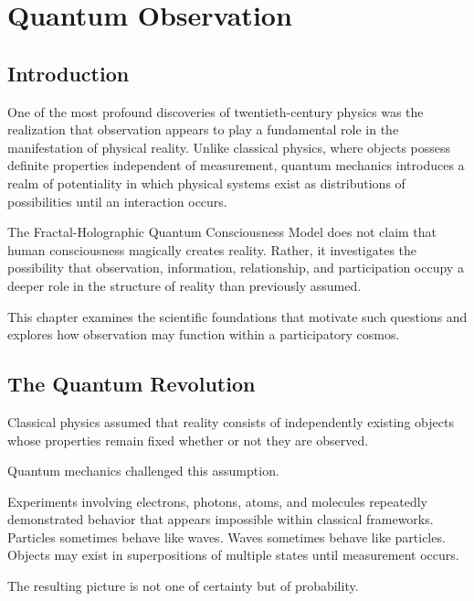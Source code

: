 \chapter{Quantum Observation}

\section{Introduction}

One of the most profound discoveries of twentieth-century physics was the realization that observation appears to play a fundamental role in the manifestation of physical reality. Unlike classical physics, where objects possess definite properties independent of measurement, quantum mechanics introduces a realm of potentiality in which physical systems exist as distributions of possibilities until an interaction occurs.

The Fractal-Holographic Quantum Consciousness Model does not claim that human consciousness magically creates reality. Rather, it investigates the possibility that observation, information, relationship, and participation occupy a deeper role in the structure of reality than previously assumed.

This chapter examines the scientific foundations that motivate such questions and explores how observation may function within a participatory cosmos.


\section{The Quantum Revolution}

Classical physics assumed that reality consists of independently existing objects whose properties remain fixed whether or not they are observed.

Quantum mechanics challenged this assumption.

Experiments involving electrons, photons, atoms, and molecules repeatedly demonstrated behavior that appears impossible within classical frameworks. Particles sometimes behave like waves. Waves sometimes behave like particles. Objects may exist in superpositions of multiple states until measurement occurs.

The resulting picture is not one of certainty but of probability.

